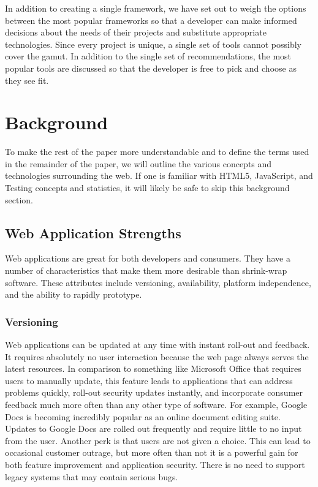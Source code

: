 \documentclass[12pt]{ucthesis}
\begin{document}
In addition to creating a single framework, we have set out to weigh the options between the most popular frameworks so that a developer can make informed decisions about the needs of their projects and substitute appropriate technologies. Since every project is unique, a single set of tools cannot possibly cover the gamut. In addition to the single set of recommendations, the most popular tools are discussed so that the developer is free to pick and choose as they see fit.

\chapter{Background}
To make the rest of the paper more understandable and to define the terms used in the remainder of the paper, we will outline the various concepts and technologies surrounding the web.
If one is familiar with HTML5, JavaScript, and Testing concepts and statistics, it will likely be safe to skip this background section.

\section{Web Application Strengths}
Web applications are great for both developers and consumers. They have a number of characteristics that make them more desirable than shrink-wrap software. These attributes include versioning, availability, platform independence, and the ability to rapidly prototype.

\subsection{Versioning}
Web applications can be updated at any time with instant roll-out and feedback. It requires absolutely no user interaction because the web page always serves the latest resources. In comparison to something like Microsoft Office that requires users to manually update, this feature leads to applications that can address problems quickly, roll-out security updates instantly, and incorporate consumer feedback much more often than any other type of software. For example, Google Docs is becoming incredibly popular as an online document editing suite. Updates to Google Docs are rolled out frequently and require little to no input from the user. Another perk is that users are not given a choice. This can lead to occasional customer outrage, but more often than not it is a powerful gain for both feature improvement and application security. There is no need to support legacy systems that may contain serious bugs.
\end{document}
